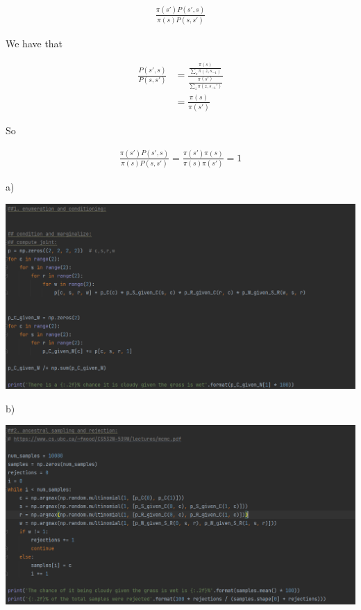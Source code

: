 \documentclass[10pt]{homeworg}
\begin{document}
\begin{align*}
\frac{\pi(s')P(s',s)}{\pi(s)P(s,s')}
\end{align*}

We have that

\begin{align*}
\frac{P(s',s)}{P(s,s')} &= \frac{\frac{\pi(s)}{\sum_z \pi(z,s_{-1})}}{\frac{\pi(s')}{\sum_z \pi(z, s_{-1}')}}\\
					   &= \frac{\pi(s)}{\pi(s')}
\end{align*}

So

\begin{align*}
\frac{\pi(s')P(s',s)}{\pi(s)P(s,s')} = \frac{\pi(s')\pi(s)}{\pi(s)\pi(s')} = 1
\end{align*}



\exercise
a)
\begin{center}
\includegraphics[scale=0.7]{figures/q3_a.PNG}
\end{center}


b)
\begin{center}
\includegraphics[scale=0.7]{figures/q3_b.PNG}
\end{center}
\end{document}
